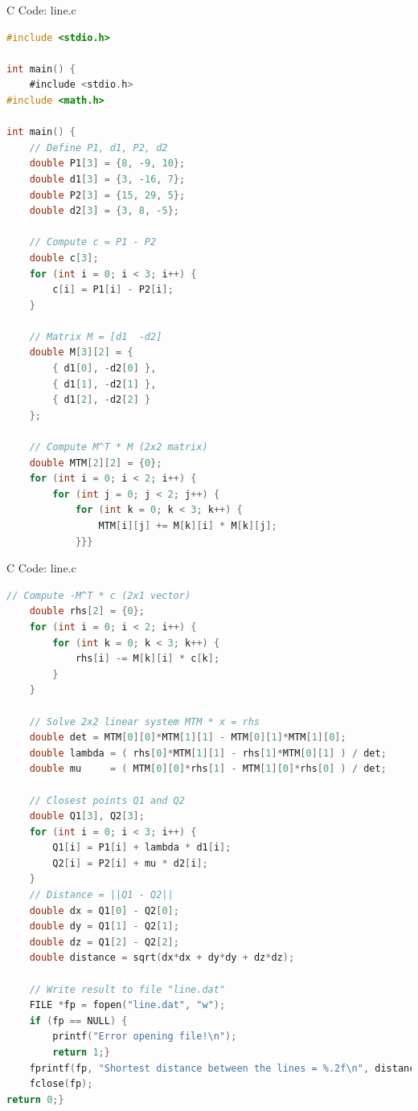 \documentclass{beamer}
\numberwithin{equation}{section}
\theoremstyle{remark}
\begin{document}
\begin{frame}[fragile]{C Code: line.c}
\begin{lstlisting}[language=C]
#include <stdio.h>

int main() {
    #include <stdio.h>
#include <math.h>

int main() {
    // Define P1, d1, P2, d2
    double P1[3] = {8, -9, 10};
    double d1[3] = {3, -16, 7};
    double P2[3] = {15, 29, 5};
    double d2[3] = {3, 8, -5};

    // Compute c = P1 - P2
    double c[3];
    for (int i = 0; i < 3; i++) {
        c[i] = P1[i] - P2[i];
    }

    // Matrix M = [d1  -d2]
    double M[3][2] = {
        { d1[0], -d2[0] },
        { d1[1], -d2[1] },
        { d1[2], -d2[2] }
    };

    // Compute M^T * M (2x2 matrix)
    double MTM[2][2] = {0};
    for (int i = 0; i < 2; i++) {
        for (int j = 0; j < 2; j++) {
            for (int k = 0; k < 3; k++) {
                MTM[i][j] += M[k][i] * M[k][j];
            }}}
\end{lstlisting}
\end{frame}

\begin{frame}[fragile]{C Code: line.c}
\begin{lstlisting}[language=C]
    // Compute -M^T * c (2x1 vector)
    double rhs[2] = {0};
    for (int i = 0; i < 2; i++) {
        for (int k = 0; k < 3; k++) {
            rhs[i] -= M[k][i] * c[k];
        }
    }

    // Solve 2x2 linear system MTM * x = rhs
    double det = MTM[0][0]*MTM[1][1] - MTM[0][1]*MTM[1][0];
    double lambda = ( rhs[0]*MTM[1][1] - rhs[1]*MTM[0][1] ) / det;
    double mu     = ( MTM[0][0]*rhs[1] - MTM[1][0]*rhs[0] ) / det;

    // Closest points Q1 and Q2
    double Q1[3], Q2[3];
    for (int i = 0; i < 3; i++) {
        Q1[i] = P1[i] + lambda * d1[i];
        Q2[i] = P2[i] + mu * d2[i];
    }
    // Distance = ||Q1 - Q2||
    double dx = Q1[0] - Q2[0];
    double dy = Q1[1] - Q2[1];
    double dz = Q1[2] - Q2[2];
    double distance = sqrt(dx*dx + dy*dy + dz*dz);

    // Write result to file "line.dat"
    FILE *fp = fopen("line.dat", "w");
    if (fp == NULL) {
        printf("Error opening file!\n");
        return 1;}
    fprintf(fp, "Shortest distance between the lines = %.2f\n", distance);
    fclose(fp);
return 0;}
\end{lstlisting}
\end{frame}
\end{document}
